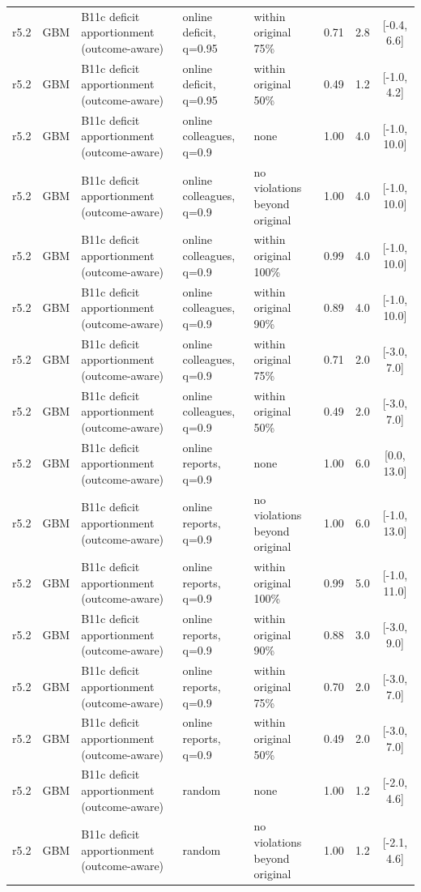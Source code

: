 \begin{longtable}{lllp{4.2cm}p{3.4cm}ccc}
r5.2 & GBM & B11c deficit apportionment (outcome-aware) & online deficit, q=0.95 & within original 75\% & 0.71 & 2.8 & [-0.4, 6.6] \\
r5.2 & GBM & B11c deficit apportionment (outcome-aware) & online deficit, q=0.95 & within original 50\% & 0.49 & 1.2 & [-1.0, 4.2] \\
r5.2 & GBM & B11c deficit apportionment (outcome-aware) & online colleagues, q=0.9 & none & 1.00 & 4.0 & [-1.0, 10.0] \\
r5.2 & GBM & B11c deficit apportionment (outcome-aware) & online colleagues, q=0.9 & no violations beyond original & 1.00 & 4.0 & [-1.0, 10.0] \\
r5.2 & GBM & B11c deficit apportionment (outcome-aware) & online colleagues, q=0.9 & within original 100\% & 0.99 & 4.0 & [-1.0, 10.0] \\
r5.2 & GBM & B11c deficit apportionment (outcome-aware) & online colleagues, q=0.9 & within original 90\% & 0.89 & 4.0 & [-1.0, 10.0] \\
r5.2 & GBM & B11c deficit apportionment (outcome-aware) & online colleagues, q=0.9 & within original 75\% & 0.71 & 2.0 & [-3.0, 7.0] \\
r5.2 & GBM & B11c deficit apportionment (outcome-aware) & online colleagues, q=0.9 & within original 50\% & 0.49 & 2.0 & [-3.0, 7.0] \\
r5.2 & GBM & B11c deficit apportionment (outcome-aware) & online reports, q=0.9 & none & 1.00 & 6.0 & [0.0, 13.0] \\
r5.2 & GBM & B11c deficit apportionment (outcome-aware) & online reports, q=0.9 & no violations beyond original & 1.00 & 6.0 & [-1.0, 13.0] \\
r5.2 & GBM & B11c deficit apportionment (outcome-aware) & online reports, q=0.9 & within original 100\% & 0.99 & 5.0 & [-1.0, 11.0] \\
r5.2 & GBM & B11c deficit apportionment (outcome-aware) & online reports, q=0.9 & within original 90\% & 0.88 & 3.0 & [-3.0, 9.0] \\
r5.2 & GBM & B11c deficit apportionment (outcome-aware) & online reports, q=0.9 & within original 75\% & 0.70 & 2.0 & [-3.0, 7.0] \\
r5.2 & GBM & B11c deficit apportionment (outcome-aware) & online reports, q=0.9 & within original 50\% & 0.49 & 2.0 & [-3.0, 7.0] \\
r5.2 & GBM & B11c deficit apportionment (outcome-aware) & random & none & 1.00 & 1.2 & [-2.0, 4.6] \\
r5.2 & GBM & B11c deficit apportionment (outcome-aware) & random & no violations beyond original & 1.00 & 1.2 & [-2.1, 4.6] \\

\end{longtable}
